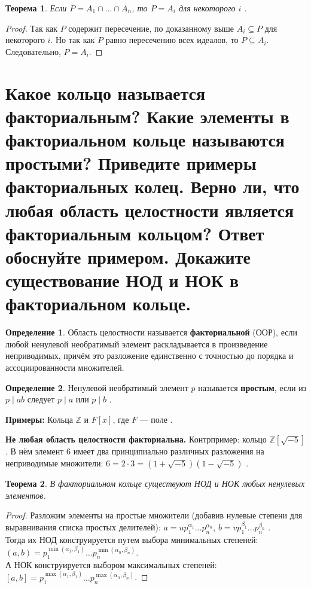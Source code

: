 \documentclass[12pt, a4paper]{article}
\theoremstyle{definition}
\newtheorem{definition}{Определение}[section]
\theoremstyle{plain}
\newtheorem{theorem}{Теорема}[section]
\begin{document}
	\begin{theorem}
		Если $P = A_1 \cap \dots \cap A_n$, то $P = A_i$ для некоторого $i$ .
	\end{theorem}
	\begin{proof}
		Так как $P$ содержит пересечение, по доказанному выше $A_i \subseteq P$ для некоторого $i$. Но так как $P$ равно пересечению всех идеалов, то $P \subseteq A_i$. Следовательно, $P = A_i$.
	\end{proof}
	
	\newpage
	
	\section{Какое кольцо называется факториальным? Какие элементы в факториальном кольце называются простыми? Приведите примеры факториальных колец. Верно ли, что любая область целостности является факториальным кольцом? Ответ обоснуйте примером. Докажите существование НОД и НОК в факториальном кольце.}
	
	\begin{definition}
		Область целостности называется \textbf{факториальной} (ООР), если любой ненулевой необратимый элемент раскладывается в произведение неприводимых, причём это разложение единственно с точностью до порядка и ассоциированности множителей.
	\end{definition}
	
	\begin{definition}
		Ненулевой необратимый элемент $p$ называется \textbf{простым}, если из $p \mid ab$ следует $p \mid a$ или $p \mid b$ .
	\end{definition}
	
	\textbf{Примеры:} Кольца $\mathbb{Z}$ и $F[x]$, где $F$ — поле .
	
	\textbf{Не любая область целостности факториальна.} Контрпример: кольцо $\mathbb{Z}[\sqrt{-5}]$ . В нём элемент 6 имеет два принципиально различных разложения на неприводимые множители: $6 = 2 \cdot 3 = (1+\sqrt{-5})(1-\sqrt{-5})$ .
	
	\begin{theorem}
		В факториальном кольце существуют НОД и НОК любых ненулевых элементов.
	\end{theorem}
	\begin{proof}
		Разложим элементы на простые множители (добавив нулевые степени для выравнивания списка простых делителей): $a = u p_1^{\alpha_1} \dots p_n^{\alpha_n}$, $b = v p_1^{\beta_1} \dots p_n^{\beta_n}$ . \\
		Тогда их НОД конструируется путем выбора минимальных степеней: $(a,b) = p_1^{\min(\alpha_1, \beta_1)} \dots p_n^{\min(\alpha_n, \beta_n)}$. \\
		А НОК конструируется выбором максимальных степеней: $[a,b] = p_1^{\max(\alpha_1, \beta_1)} \dots p_n^{\max(\alpha_n, \beta_n)}$.
	\end{proof}
	
\end{document}
